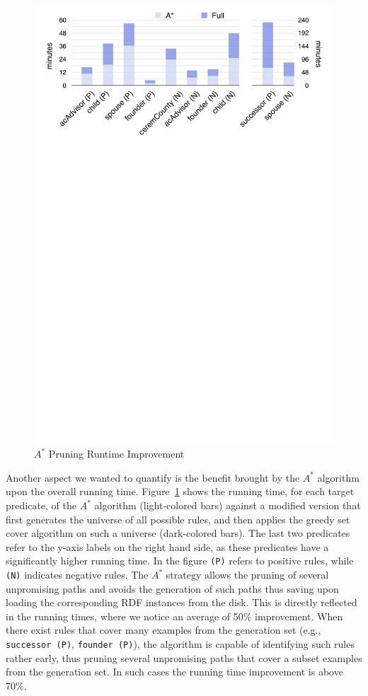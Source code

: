 \begin{figure}[htb]
	\centering
	\includegraphics[width=\columnwidth]{include/figure/a*_runtime_improv.pdf}
	\caption{$A^*$ Pruning Runtime Improvement}
	\label{fig:pruning_impact}
\end{figure}
Another aspect we wanted to quantify is the benefit brought by the $A^*$ algorithm upon the overall running time. Figure~\ref{fig:pruning_impact} shows the running time, for each target predicate, of the $A^*$ algorithm (light-colored bars) against a modified version that first generates the universe of all possible rules, and then applies the greedy set cover algorithm on such a universe (dark-colored bars). The last two predicates refer to the y-axis labels on the right hand side, as these predicates have a significantly higher running time. In the figure \texttt{(P)} refers to positive rules, while \texttt{(N)} indicates negative rules.
The $A^*$ strategy allows the pruning of several unpromising paths and avoids the generation of such paths thus saving upon loading the corresponding RDF instances from the disk. This is directly reflected in the running times, where we notice an average of 50\% improvement. When there exist rules that cover many examples from the generation set (e.g., \texttt{successor (P)}, \texttt{founder (P)}), the algorithm is capable of identifying such rules rather early, thus pruning several unpromising paths that cover a subset examples from the generation set. In such cases the running time improvement is above 70\%.

